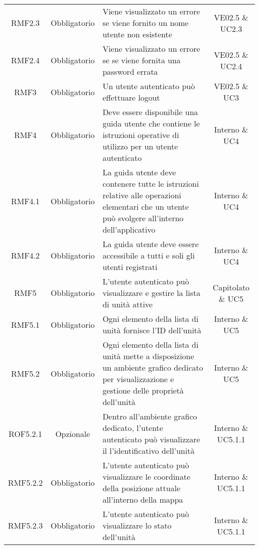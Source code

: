 \begin{longtable}[h!] { c c m{8cm} c}
		RMF2.3 & Obbligatorio & Viene visualizzato un errore se viene fornito un nome utente non esistente & VE02.5 \& UC2.3 \\
		
		RMF2.4 & Obbligatorio & Viene visualizzato un errore se se viene fornita una password errata & VE02.5 \& UC2.4 \\
		
		RMF3 & Obbligatorio & Un utente autenticato può effettuare logout & VE02.5 \& UC3 \\
		
		RMF4 & Obbligatorio & Deve essere disponibile una guida utente che contiene le istruzioni operative di utilizzo per un utente autenticato & Interno \& UC4 \\
		
		RMF4.1 & Obbligatorio & La guida utente deve contenere tutte le istruzioni relative alle operazioni elementari che un utente può svolgere all'interno dell'applicativo & Interno \& UC4 \\
		
		RMF4.2 & Obbligatorio & La guida utente deve essere accessibile a tutti e soli gli utenti registrati & Interno \& UC4 \\
		
		RMF5 & Obbligatorio & L'utente autenticato può visualizzare e gestire la lista di unità attive & Capitolato \& UC5 \\
		
		RMF5.1 & Obbligatorio & Ogni elemento della lista di unità fornisce l'ID dell'unità & Interno \& UC5 \\
		
		RMF5.2 & Obbligatorio & Ogni elemento della lista di unità mette a disposizione un ambiente grafico dedicato per visualizzazione e gestione delle proprietà dell'unità & Interno \& UC5 \\
		
		ROF5.2.1 & Opzionale & Dentro all'ambiente grafico dedicato, l'utente autenticato può visualizzare il l'identificativo dell'unità & Interno \& UC5.1.1 \\
		
		RMF5.2.2 & Obbligatorio & L'utente autenticato può visualizzare le coordinate della posizione attuale all'interno della mappa & Interno \& UC5.1.1 \\
		
		RMF5.2.3 & Obbligatorio & L'utente autenticato può visualizzare lo stato dell'unità & Interno \& UC5.1.1 \\
		

\end{longtable}
